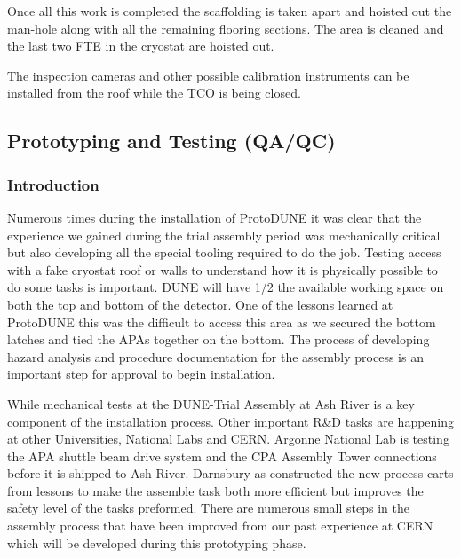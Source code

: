 Once all this work is completed the scaffolding is taken apart and hoisted out the man-hole along with all the remaining flooring sections. The area is cleaned and the last two FTE in the cryostat are hoisted out. 

The inspection cameras and other possible calibration instruments can be installed from the roof while the TCO is being closed.



\clearpage












\subsection{Prototyping and Testing (QA/QC)}
\label{sec:fdsp-tc-inst-qaqc}



\subsubsection{Introduction} 


Numerous times during the installation of ProtoDUNE it was clear that the experience we gained during the trial assembly period was mechanically critical but also developing all the special tooling required to do the job.  Testing access with a fake cryostat roof or walls to understand how it is physically possible to do some tasks is important. DUNE will have 1/2 the available working space on both the top and bottom of the detector.  One of the lessons learned at ProtoDUNE this was the difficult to access this area as we secured the bottom latches and tied the APAs together on the bottom.  The process of developing hazard analysis and procedure documentation for the assembly process is an important step for approval to begin installation.   

While mechanical tests at the DUNE-Trial Assembly at Ash River is a key component of the installation process.
Other important R\&D tasks are happening at other Universities, National Labs and CERN. Argonne National Lab is testing the APA shuttle beam drive system and the CPA Assembly Tower connections before it is shipped to Ash River.  
Darnsbury as constructed the new process carts from lessons to make the assemble task both more efficient but improves the safety level of the tasks preformed. 
There are numerous small steps in the assembly process that have been improved from our past experience at CERN which will be developed during this prototyping phase. 

